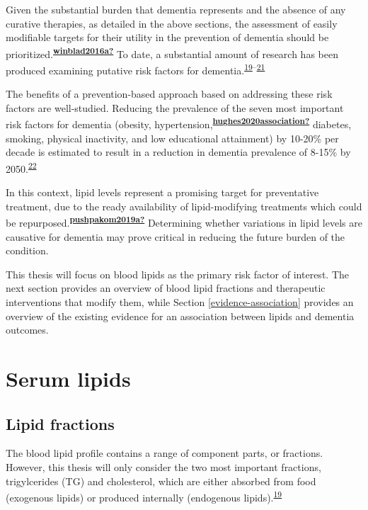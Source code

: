 \documentclass[a4paper, twoside]{templates/ociamthesis}
\begin{document}
Given the substantial burden that dementia represents and the absence of any curative therapies, as detailed in the above sections, the assessment of easily modifiable targets for their utility in the prevention of dementia should be prioritized.\textsuperscript{\protect\hyperlink{ref-winblad2016a}{\textbf{winblad2016a?}}} To date, a substantial amount of research has been produced examining putative risk factors for dementia.\textsuperscript{\protect\hyperlink{ref-feingold2000}{19}--\protect\hyperlink{ref-ansteya}{21}}

The benefits of a prevention-based approach based on addressing these risk factors are well-studied. Reducing the prevalence of the seven most important risk factors for dementia (obesity, hypertension,\textsuperscript{\protect\hyperlink{ref-hughes2020association}{\textbf{hughes2020association?}}} diabetes, smoking, physical inactivity, and low educational attainment) by 10-20\% per decade is estimated to result in a reduction in dementia prevalence of 8-15\% by 2050.\textsuperscript{\protect\hyperlink{ref-norton2014potential}{22}}

In this context, lipid levels represent a promising target for preventative treatment, due to the ready availability of lipid-modifying treatments which could be repurposed.\textsuperscript{\protect\hyperlink{ref-pushpakom2019a}{\textbf{pushpakom2019a?}}} Determining whether variations in lipid levels are causative for dementia may prove critical in reducing the future burden of the condition.

This thesis will focus on blood lipids as the primary risk factor of interest. The next section provides an overview of blood lipid fractions and therapeutic interventions that modify them, while Section \ref{evidence-association} provides an overview of the existing evidence for an association between lipids and dementia outcomes.

\hypertarget{serum-lipids}{%
\section{Serum lipids}\label{serum-lipids}}

\hypertarget{intro-lipid-fractions}{%
\subsection{Lipid fractions}\label{intro-lipid-fractions}}

The blood lipid profile contains a range of component parts, or fractions. However, this thesis will only consider the two most important fractions, trigylcerides (TG) and cholesterol, which are either absorbed from food (exogenous lipids) or produced internally (endogenous lipids).\textsuperscript{\protect\hyperlink{ref-feingold2000}{19}}
\end{document}
